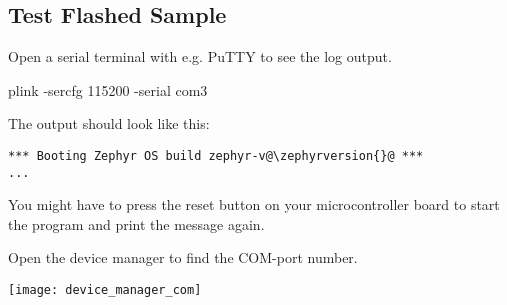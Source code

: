 \subsection{Test Flashed Sample}

Open a serial terminal with e.g. PuTTY to see the log output.

\begin{monobox}
plink -sercfg 115200 -serial com3
\end{monobox}

The output should look like this:

\begin{lstlisting}
*** Booting Zephyr OS build zephyr-v@\zephyrversion{}@ ***
...
\end{lstlisting}

You might have to press the reset button on your microcontroller board to start the program and print the message again.

\begin{infobox}
  Open the device manager to find the COM-port number.
  \begin{center}
    \texttt{[image: device\_manager\_com]}
  \end{center}
\end{infobox}
